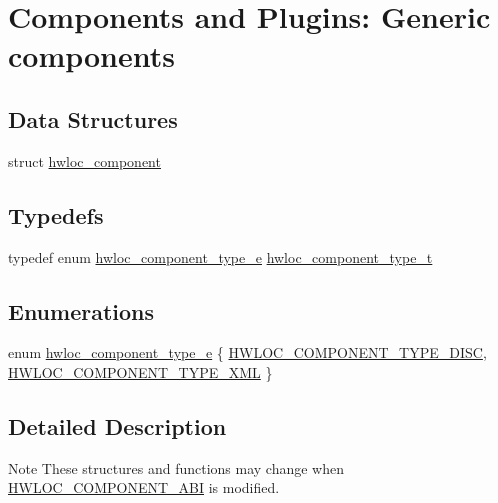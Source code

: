 \hypertarget{a00229}{}\section{Components and Plugins\+: Generic components}
\label{a00229}
\subsection*{Data Structures}
\begin{DoxyCompactItemize}
\item 
struct \hyperlink{a00378}{hwloc\+\_\+component}
\end{DoxyCompactItemize}
\subsection*{Typedefs}
\begin{DoxyCompactItemize}
\item 
typedef enum \hyperlink{a00229_ga397a1bf7d21dd073320ad0045340f463}{hwloc\+\_\+component\+\_\+type\+\_\+e} \hyperlink{a00229_ga0aebfa65317af10bb18d7d35f6dc05b8}{hwloc\+\_\+component\+\_\+type\+\_\+t}
\end{DoxyCompactItemize}
\subsection*{Enumerations}
\begin{DoxyCompactItemize}
\item 
enum \hyperlink{a00229_ga397a1bf7d21dd073320ad0045340f463}{hwloc\+\_\+component\+\_\+type\+\_\+e} \{ \hyperlink{a00229_gga397a1bf7d21dd073320ad0045340f463a5d6e561f467fe9795a29e7368b613900}{H\+W\+L\+O\+C\+\_\+\+C\+O\+M\+P\+O\+N\+E\+N\+T\+\_\+\+T\+Y\+P\+E\+\_\+\+D\+I\+SC}, 
\hyperlink{a00229_gga397a1bf7d21dd073320ad0045340f463adea00cd839c2141c032e1569fd5592bd}{H\+W\+L\+O\+C\+\_\+\+C\+O\+M\+P\+O\+N\+E\+N\+T\+\_\+\+T\+Y\+P\+E\+\_\+\+X\+ML}
 \}
\end{DoxyCompactItemize}


\subsection{Detailed Description}
\begin{DoxyNote}{Note}
These structures and functions may change when \hyperlink{a00182_gaac5bc1f46f55e10ef0141a68ce70e21f}{H\+W\+L\+O\+C\+\_\+\+C\+O\+M\+P\+O\+N\+E\+N\+T\+\_\+\+A\+BI} is modified. 
\end{DoxyNote}


